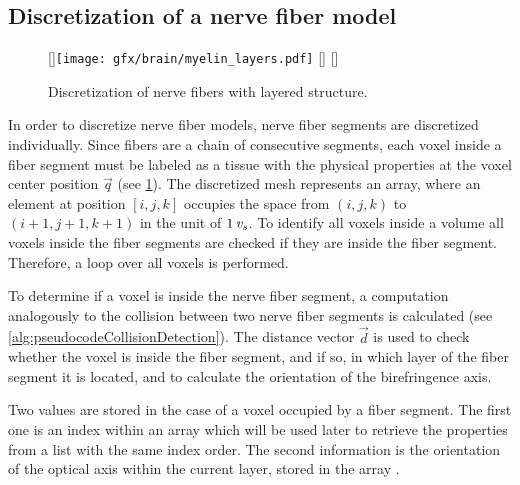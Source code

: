 \subsection{Discretization of a nerve fiber model}
%
\begin{figure}[!t]
\centering
\setlength{\tikzwidth}{0.3\textwidth}
[\tikzwidth]{\texttt{[image: gfx/brain/myelin\_layers.pdf]}\vspace{0mm}}\hfill
{}
[\tikzwidth]{\vspace{-5mm}}\hfill
{}
[\tikzwidth]{\vspace{-5mm}}
\caption{Discretization of nerve fibers with layered structure.}
\label{fig:fiber_discretization}
\end{figure}
%
In order to discretize nerve fiber models, nerve fiber segments are discretized individually.
Since fibers are a chain of consecutive segments, each voxel inside a fiber segment must be labeled as a tissue with the physical properties at the voxel center position $\vec{q}$ (see \cref{fig:fiber_discretization}).
The discretized mesh represents an array, where an element at position $[i,j,k]$ occupies the space from $(i,j,k)$ to $(i+1,j+1,k+1)$ in the unit of $\SI{1}{\textnormal{$\mathit{v_{s}}$}}$.
To identify all voxels inside a volume all voxels inside the fiber segments are checked if they are inside the fiber segment.
Therefore, a loop over all voxels is performed.
\par
%
To determine if a voxel is inside the nerve fiber segment,
a computation analogously to the collision between two nerve fiber segments is calculated (see \cref{alg:pseudocodeCollisionDetection}).
The distance vector $\vec{d}$ is used to check whether the voxel is inside the fiber segment, and if so, in which layer of the fiber segment it is located, and to calculate the orientation of the birefringence axis.
\par
%
Two values are stored in the case of a voxel occupied by a fiber segment. 
The first one is an index within an array  which will be used later to retrieve the properties from a list with the same index order.
The second information is the orientation of the optical axis within the current layer, stored in the array .
